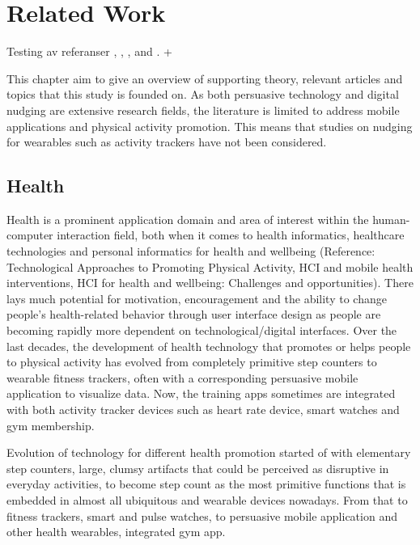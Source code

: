 \chapter{Related Work}
Testing av referanser \cite{acquisti_nudges_2017}, \cite{al_stairs_nodate} \cite{suri_stairs_2014}, \cite{fogg_persuasive_2003}, and \cite{hamper_behavior_2016}. +  \cite{karl_chapter_nodate}

This chapter aim to give an overview of supporting theory, relevant articles and topics that this study is founded on. As both persuasive technology and digital nudging are extensive research fields, the literature is limited to address mobile applications and physical activity promotion. This means that studies on nudging for wearables such as activity trackers have not been considered.

\section{Health}
Health is a prominent application domain and area of interest within the human-computer interaction field, both when it comes to health informatics, healthcare technologies and personal informatics for health and wellbeing (Reference: Technological Approaches to Promoting Physical Activity, HCI and mobile health interventions, HCI for health and wellbeing: Challenges and opportunities). There lays much potential for motivation, encouragement and the ability to change people’s health-related behavior through user interface design as people are becoming rapidly more dependent on technological/digital interfaces. Over the last decades, the development of health technology that promotes or helps people to physical activity has evolved from completely primitive step counters to wearable fitness trackers, often with a corresponding persuasive mobile application to visualize data. Now, the training apps sometimes are integrated with both activity tracker devices  such as heart rate device, smart watches and gym membership. 

Evolution of technology for different health promotion started of with elementary step counters, large, clumsy artifacts that could be perceived as disruptive in everyday activities, to become step count as the most primitive functions that is embedded in almost all ubiquitous and wearable devices nowadays. From that to fitness trackers, smart and pulse watches, to persuasive mobile application and other health wearables, integrated gym app.

